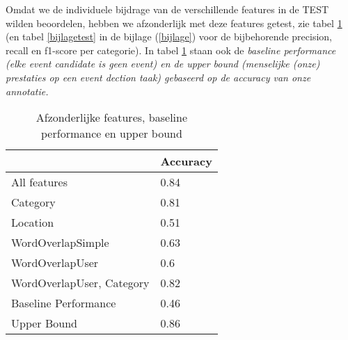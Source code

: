 {{Omdat we de individuele bijdrage van de verschillende features in de TEST wilden beoordelen, hebben we afzonderlijk met deze features getest,
zie tabel \ref{testfeatures} (en tabel \ref{bijlagetest} in de bijlage (\ref{bijlage}) voor de bijbehorende precision, recall en f1-score per
categorie). In tabel \ref{testfeatures} staan ook de \it{baseline performance} (elke event candidate is geen event) en de \it{upper bound} (menselijke
(onze) prestaties op een event dection taak) gebaseerd op de accuracy van onze annotatie.

\begin{table}[H]
\centering
\caption{Afzonderlijke features, baseline performance en upper bound}\label{testfeatures}
\vspace*{-5pt}
\begin{tabular}{|l|l|}
\hline
                          & Accuracy \\ \hline
All features              & 0.84     \\ \hline
Category                  & 0.81     \\ \hline
Location                  & 0.51     \\ \hline
WordOverlapSimple         & 0.63     \\ \hline
WordOverlapUser           & 0.6      \\ \hline
WordOverlapUser, Category & 0.82     \\ \hline
Baseline Performance      & 0.46     \\ \hline
Upper Bound               & 0.86     \\ \hline
\end{tabular}
\end{table}

}}
